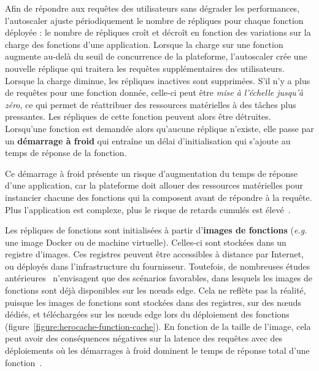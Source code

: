 Afin de répondre aux requêtes des utilisateurs sans dégrader les performances, l'autoscaler ajuste périodiquement le nombre de répliques pour chaque fonction déployée : le nombre de répliques croît et décroît en fonction des variations sur la charge des fonctions d'une application. Lorsque la charge sur une fonction augmente au-delà du seuil de concurrence de la plateforme, l'autoscaler crée une nouvelle réplique qui traitera les requêtes supplémentaires des utilisateurs. Lorsque la charge diminue, les répliques inactives sont supprimées. S'il n'y a plus de requêtes pour une fonction donnée, celle-ci peut être \textit{mise à l'échelle jusqu'à zéro}, ce qui permet de réattribuer des ressources matérielles à des tâches plus pressantes. Les répliques de cette fonction peuvent alors être détruites. Lorsqu'une fonction est demandée alors qu'aucune réplique n'existe, elle passe par un \textbf{démarrage à froid} qui entraîne un délai d'initialisation qui s'ajoute au temps de réponse de la fonction.

Ce démarrage à froid présente un risque d'augmentation du temps de réponse d'une application, car la plateforme doit allouer des ressources matérielles pour instancier chacune des fonctions qui la composent avant de répondre à la requête. Plus l'application est complexe, plus le risque de retards cumulés est élevé~\cite{mohanAgileColdStartsa}.

Les répliques de fonctions sont initialisées à partir d'\textbf{images de fonctions} (\textit{e.g.} une image Docker ou de machine virtuelle). Celles-ci sont stockées dans un registre d'images. Ces registres peuvent être accessibles à distance par Internet, ou déployés dans l'infrastructure du fournisseur. Toutefois, de nombreuses études antérieures~\cite{bhasiCypressInputSizesensitive2022, zijunFassflowEfficient2022, smithFaDOFaaSFunctions2022, zhangFIRSTExploitingMultiDimensional2023} n'envisagent que des scénarios favorables, dans lesquels les images de fonctions sont déjà disponibles sur les nœuds edge. Cela ne reflète pas la réalité, puisque les images de fonctions sont stockées dans des registres, sur des nœuds dédiés, et téléchargées sur les nœuds edge lors du déploiement des fonctions (figure~\ref{figure:herocache-function-cache}). En fonction de la taille de l'image, cela peut avoir des conséquences négatives sur la latence des requêtes avec des déploiements où les démarrages à froid dominent le temps de réponse total d'une fonction~\cite{yanHermesEfficientCache2020}.

